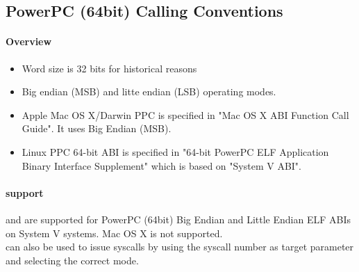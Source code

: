 %
%
%
%

\subsection{PowerPC (64bit) Calling Conventions}

\paragraph{Overview}

\begin{itemize}
\item Word size is 32 bits for historical reasons
\item Big endian (MSB) and litte endian (LSB) operating modes.
\item Apple Mac OS X/Darwin PPC is specified in "Mac OS X ABI Function Call Guide"\cite{ppcMacOSX}. It uses Big Endian (MSB).
\item Linux PPC 64-bit ABI is specified in "64-bit PowerPC ELF Application Binary Interface Supplement"\cite{ppcelf64abi} which is based on "System V ABI".
\end{itemize}

\paragraph{ support}

 and  are supported for PowerPC (64bit)
Big Endian and Little Endian ELF ABIs on System V systems. Mac OS X is not
supported.\\
 can also be used to issue syscalls by using the syscall
number as target parameter and selecting the correct mode.



